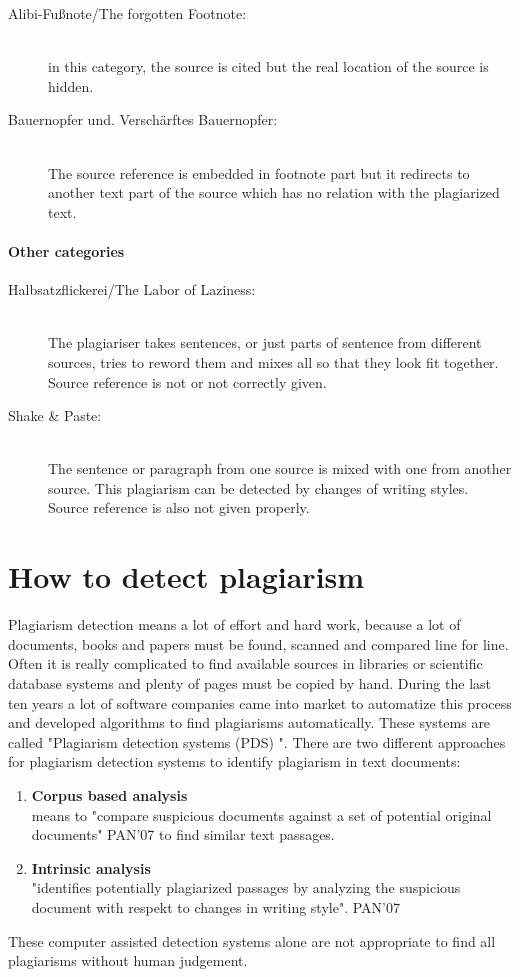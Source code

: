 \begin{description}
\item[Alibi-Fußnote/The forgotten Footnote:] \hfill \\
in this category, the source is cited but the real location of the source is 
hidden.  

\item[Bauernopfer und. Verschärftes Bauernopfer:] \hfill \\
The source reference is embedded in footnote part but it redirects to 
another text part of the source which has no relation with the plagiarized text.
\end{description}

\paragraph{Other categories}


\begin{description}
\item[Halbsatzflickerei/The Labor of Laziness:] \hfill \\
The plagiariser takes sentences, or just parts of sentence from different 
sources, tries to reword them and mixes all so that they look fit together. Source reference is not or not correctly 
given.

\item[Shake \& Paste:] \hfill \\
The sentence or paragraph from one source is mixed with one from another source. This 
plagiarism can be detected by changes of writing styles. Source reference is also not given properly.
\end{description}



\newpage
\section{How to detect plagiarism}
Plagiarism detection means a lot of effort and hard work, because a lot of documents, books and papers must be found, scanned and compared line for line. Often it is really complicated to find available sources in libraries or scientific database systems and plenty of pages must be copied by hand. 
During the last ten years a lot of software companies came into market to automatize this process and developed algorithms to find plagiarisms automatically. These systems are called "Plagiarism detection systems (PDS) ". 
There are two different approaches for plagiarism detection systems to identify plagiarism in text documents:
\begin{enumerate}
\item \textbf{Corpus based analysis}\\
means to "compare suspicious documents against a set of potential original documents" PAN'07
to find similar text passages.
\item \textbf{Intrinsic analysis}\\
"identifies potentially plagiarized passages by analyzing the suspicious document with respekt to changes in writing style". PAN'07
\end{enumerate}
These computer assisted detection systems alone are not appropriate to find all plagiarisms without human judgement.  

